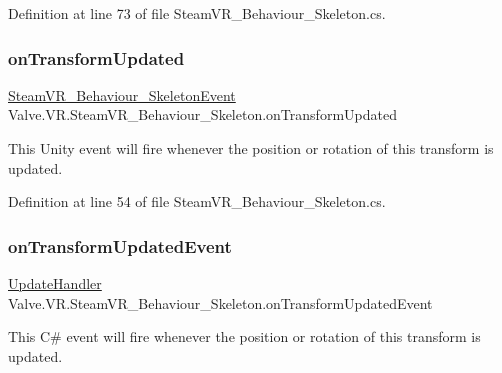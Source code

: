 Definition at line 73 of file Steam\+V\+R\+\_\+\+Behaviour\+\_\+\+Skeleton.\+cs.

\mbox{\label{class_valve_1_1_v_r_1_1_steam_v_r___behaviour___skeleton_a440fdb99dd19fb6af79382f1f5a8b252}} 
\subsubsection{\texorpdfstring{onTransformUpdated}{onTransformUpdated}}
{\footnotesize\ttfamily \mbox{\hyperlink{class_valve_1_1_v_r_1_1_steam_v_r___behaviour___skeleton_event}{Steam\+V\+R\+\_\+\+Behaviour\+\_\+\+Skeleton\+Event}} Valve.\+V\+R.\+Steam\+V\+R\+\_\+\+Behaviour\+\_\+\+Skeleton.\+on\+Transform\+Updated}



This Unity event will fire whenever the position or rotation of this transform is updated. 



Definition at line 54 of file Steam\+V\+R\+\_\+\+Behaviour\+\_\+\+Skeleton.\+cs.

\mbox{\label{class_valve_1_1_v_r_1_1_steam_v_r___behaviour___skeleton_aa9dad2b5001f6b3cf5c5adf0307cffa2}} 
\subsubsection{\texorpdfstring{onTransformUpdatedEvent}{onTransformUpdatedEvent}}
{\footnotesize\ttfamily \mbox{\hyperlink{class_valve_1_1_v_r_1_1_steam_v_r___behaviour___skeleton_aca86be067e5094667bce3ba86677dd0b}{Update\+Handler}} Valve.\+V\+R.\+Steam\+V\+R\+\_\+\+Behaviour\+\_\+\+Skeleton.\+on\+Transform\+Updated\+Event}



This C\# event will fire whenever the position or rotation of this transform is updated. 




